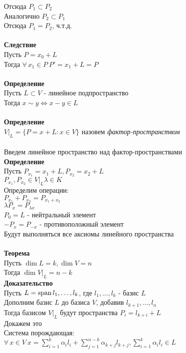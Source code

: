 \documentclass[12pt]{article}
\begin{document}
Отсюда $P_1 \subset P_2$\\
Аналогично $P_2 \subset P_1$\\
Отсюда $P_1 = P_2$, ч.т.д.\\\\
\textbf{Следствие}\\
Пусть $P =x_0 + L$\\
Тогда $\forall\,x_1 \in P\ P'=x_1+L = P$\\\\
\textbf{Определение}\\
Пусть $L \subset V$ - линейное подпространство\\
Тогда $x\sim y \Leftrightarrow x-y \in L$\\\\
\textbf{Определение}\\
$V|_L = \{P=x+L : x\in V\}$ назовем \textit{фактор-пространством}\\\\
Введем линейное пространство над фактор-пространствами\\
\textbf{Определение}\\
Пусть $P_{x_1} = x_1+L, P_{x_2}=x_2+L$\\
$P_{x_1},P_{x_2} \in V|_L \lambda \in K$\\
Определим операции:\\
$P_{x_1} + P_{x_2} = P_{x_1+x_2}$\\
$\lambda P_x = P_{\lambda x}$\\
$P_0 = L$ - нейтральный элемент\\
$-P_x = P_{-x}$ - противоположный элемент\\
Будут выполняться все аксиомы линейного пространства\\\\
\textbf{Теорема}\\
Пусть $\dim L = k, \dim V = n$\\
Тогда $\dim V|_L = n-k$\\
\textbf{Доказательство}\\
Пусть $L = \operatorname{span} l_1,\ldots,l_k$, где $l_1,\ldots,l_k$ - базис $L$\\
Дополним базис $L$ до базиса $V$, добавив $l_{k+1},\ldots,l_n$\\
Тогда базисом $V|_L$ будут пространства $P_i = l_{k+i} + L$\\
Докажем это\\
Система порождающая:\\
$\forall\,x \in V\ x=\sum_{i=1}^k \alpha_il_i + \sum_{j=1}^{n-k} \alpha_{k+j}l_{k+j}, \sum_{i=1}^k \alpha_il_i \in L$\\
\end{document}
